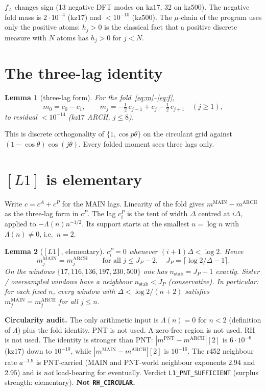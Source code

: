 \documentclass[11pt]{article}
\newtheorem{lemma}{Lemma}
\begin{document}
$f_A$ changes sign (13 negative DFT modes
on kz$17$, 32 on kz$500$).
The negative fold mass is
$2\cdot10^{-4}$ (kz$17$) and
$<10^{-10}$ (kz$500$).
The $\mu$-chain of the program uses only
the positive atoms: $h_j>0$ is the
classical fact that a positive discrete
measure with $N$ atoms has $h_j>0$ for
$j<N$.

\section{The three-lag identity}\label{sec:lag}

\begin{lemma}[three-lag form]\label{lem:lag}
For the fold~\eqref{eq:m}--\eqref{eq:f},
\[
m_0=c_0-c_1,
\qquad
m_j
=-\tfrac12\,c_{j-1}+c_j-\tfrac12\,c_{j+1}
\quad(j\ge 1),
\]
to residual $<10^{-14}$ (kz$17$ ARCH,
$j\le 8$).
\end{lemma}

This is discrete orthogonality of
$\{1,\cos p\theta\}$ on the circulant
grid against $(1-\cos\theta)\cos(j\theta)$.
Every folded moment sees three lags only.

\section{$[L1]$ is elementary}\label{sec:L1}

Write $c=c^A+c^P$ for the MAIN lags.
Linearity of the fold gives
$m^{\mathrm{MAIN}}-m^{\mathrm{ARCH}}$
as the three-lag form in $c^P$.
The lag $c^P_i$ is the tent of width
$\Delta$ centred at $i\Delta$, applied
to $-\Lambda(n)n^{-1/2}$.
Its support starts at the smallest
$u=\log n$ with $\Lambda(n)\neq 0$,
i.e.\ $n=2$.

\begin{lemma}[{$[L1]$, elementary}]\label{lem:L1}
$c^P_i=0$ whenever $(i+1)\Delta<\log 2$.
Hence
\[
m_j^{\mathrm{MAIN}}
=m_j^{\mathrm{ARCH}}
\qquad\text{for all }
j\le J_P-2,
\quad
J_P=\bigl\lceil\log 2/\Delta-1\bigr\rceil.
\]
On the windows
$\{17,116,136,197,230,500\}$ one has
$n_{\mathrm{stab}}=J_P-1$ exactly.
Sister / oversampled windows have a
\emph{neighbour} $n_{\mathrm{stab}}<J_P$
(conservative).
In particular: for each fixed $n$, every
window with $\Delta<\log 2/(n+2)$
satisfies $m_j^{\mathrm{MAIN}}=m_j^{\mathrm{ARCH}}$
for all $j\le n$.
\end{lemma}

\textbf{Circularity audit.}
The only arithmetic input is
$\Lambda(n)=0$ for $n<2$ (definition of
$\Lambda$) plus the fold identity.
PNT is not used.
A zero-free region is not used.
RH is not used.
The identity is stronger than PNT:
$|m^{\mathrm{PNT}}-m^{\mathrm{ARCH}}|[2]$
is $6\cdot10^{-6}$ (kz$17$) down to
$10^{-10}$, while
$|m^{\mathrm{MAIN}}-m^{\mathrm{ARCH}}|[2]$
is $10^{-16}$.
The r452 neighbour rate $a^{-1.9}$ is
PNT-carried (MAIN and PNT-world neighbour
exponents $2.94$ and $2.95$) and is
\emph{not} load-bearing for eventually.
Verdict \texttt{L1\_PNT\_SUFFICIENT}
(surplus strength: elementary).
\textbf{Not \texttt{RH\_CIRCULAR}.}
\end{document}
